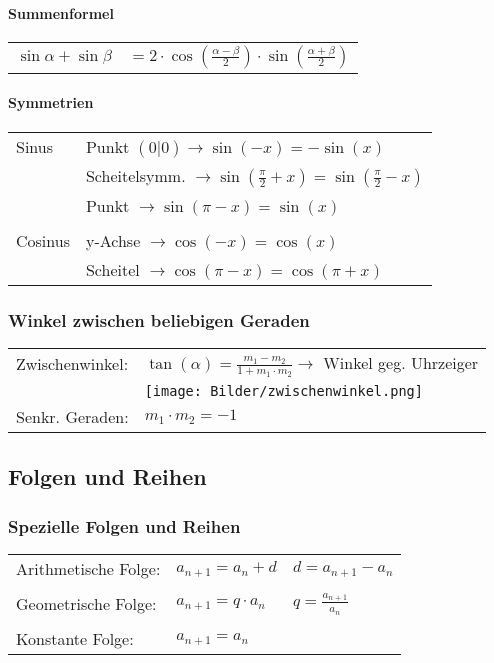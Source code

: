     \paragraph{Summenformel}
        \begin{tabular}{ll}
            $\sin\alpha + \sin\beta$ & $= 2 \cdot \cos(\frac{\alpha - \beta}{2}) \cdot \sin(\frac{\alpha + \beta}{2})$ \\
        \end{tabular}
    
    \paragraph{Symmetrien} 
        \begin{tabular}{ll}
            Sinus & Punkt $(0|0) \rightarrow \sin(-x) = - \sin(x)$ \\
                  & Scheitelsymm. $\rightarrow \sin(\frac{\pi}{2} + x) = \sin(\frac{\pi}{2} - x)$ \\
                  & Punkt $\rightarrow \sin(\pi - x) = \sin(x)$ \\
            \\
            Cosinus & y-Achse $\rightarrow \cos(-x) = \cos(x)$ \\
                    & Scheitel $\rightarrow \cos(\pi - x) = \cos(\pi + x)$ \\		
        \end{tabular}
        
\subsubsection{Winkel zwischen beliebigen Geraden}
    \begin{tabular}{ll}
        Zwischenwinkel: & $\tan(\alpha) = \frac{m_1 - m_2}{1 + m_1 \cdot m_2} \rightarrow$ Winkel geg. Uhrzeiger \\
                        & \texttt{[image: Bilder/zwischenwinkel.png]}\\
        Senkr. Geraden: & $m_1 \cdot m_2 = -1$ \\
    \end{tabular}
    
\subsection{Folgen und Reihen}
    
\subsubsection{Spezielle Folgen und Reihen}
    \begin{tabular}{lll}
        Arithmetische Folge: & $a_{n+1} = a_n + d$ & $d = a_{n+1} - a_n$ \\
        \\
        Geometrische Folge: & $a_{n+1} = q \cdot a_n $ & $q = \frac{a_{n+1}}{a_n}$ \\
        \\
        Konstante Folge: & $a_{n+1} = a_n$  & \\
    \end{tabular}				
        
